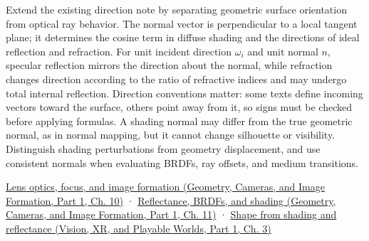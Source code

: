 \hypertarget{appendix-44e00863b4d5-university-course-development}{}

Extend the existing direction note by separating geometric surface orientation from optical ray behavior. The normal vector is perpendicular to a local tangent plane; it determines the cosine term in diffuse shading and the directions of ideal reflection and refraction. For unit incident direction \(\omega_i\) and unit normal \(n\), specular reflection mirrors the direction about the normal, while refraction changes direction according to the ratio of refractive indices and may undergo total internal reflection. Direction conventions matter: some texts define incoming vectors toward the surface, others point away from it, so signs must be checked before applying formulas. A shading normal may differ from the true geometric normal, as in normal mapping, but it cannot change silhouette or visibility. Distinguish shading perturbations from geometry displacement, and use consistent normals when evaluating BRDFs, ray offsets, and medium transitions.

\href{../03-Geometry-Cameras-and-Image-Formation-P01/main.pdf\#nameddest=03-visual-computing-i-ch003-lens-optics-focus-and-image-formation}{Lens optics, focus, and image formation (Geometry, Cameras, and Image Formation, Part 1, Ch. 10)} · \href{../03-Geometry-Cameras-and-Image-Formation-P01/main.pdf\#nameddest=03-visual-computing-i-ch004-reflectance-brdfs-and-shading}{Reflectance, BRDFs, and shading (Geometry, Cameras, and Image Formation, Part 1, Ch. 11)} · \href{../07-Vision-XR-and-Playable-Worlds-P01/main.pdf\#nameddest=04-visual-computing-ii-ch032-shape-from-shading-and-reflectance}{Shape from shading and reflectance (Vision, XR, and Playable Worlds, Part 1, Ch. 3)}
